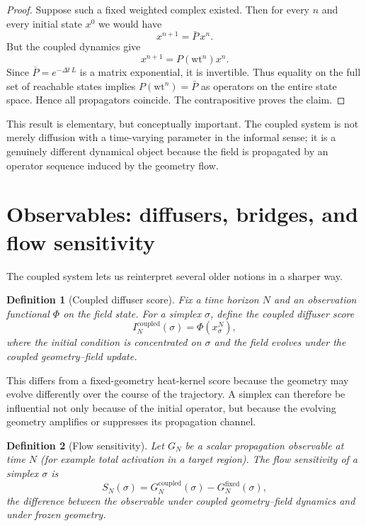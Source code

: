 \documentclass[11pt]{article}
\newtheorem{definition}{Definition}[section]
\newcommand{\wt}{\mathrm{wt}}
\begin{document}
\begin{proof}
Suppose such a fixed weighted complex existed. Then for every $n$ and every initial state $x^0$ we would have
\[
x^{n+1}=\bar P\,x^n.
\]
But the coupled dynamics give
\[
x^{n+1}=P(\wt^n)x^n.
\]
Since $\bar P=e^{-\Delta t\,L}$ is a matrix exponential, it is invertible. Thus equality on the full set of reachable states implies $P(\wt^n)=\bar P$ as operators on the entire state space. Hence all propagators coincide. The contrapositive proves the claim.
\end{proof}

This result is elementary, but conceptually important. The coupled system is not merely diffusion with a time-varying parameter in the informal sense; it is a genuinely different dynamical object because the field is propagated by an operator sequence induced by the geometry flow.

\section{Observables: diffusers, bridges, and flow sensitivity}

The coupled system lets us reinterpret several older notions in a sharper way.

\begin{definition}[Coupled diffuser score]
Fix a time horizon $N$ and an observation functional $\Phi$ on the field state. For a simplex $\sigma$, define the coupled diffuser score
\[
I_N^{\mathrm{coupled}}(\sigma)=\Phi(x_\sigma^N),
\]
where the initial condition is concentrated on $\sigma$ and the field evolves under the coupled geometry--field update.
\end{definition}

This differs from a fixed-geometry heat-kernel score because the geometry may evolve differently over the course of the trajectory. A simplex can therefore be influential not only because of the initial operator, but because the evolving geometry amplifies or suppresses its propagation channel.

\begin{definition}[Flow sensitivity]
Let $G_N$ be a scalar propagation observable at time $N$ (for example total activation in a target region). The flow sensitivity of a simplex $\sigma$ is
\[
S_N(\sigma)= G_N^{\mathrm{coupled}}(\sigma)-G_N^{\mathrm{fixed}}(\sigma),
\]
the difference between the observable under coupled geometry--field dynamics and under frozen geometry.
\end{definition}
\end{document}
